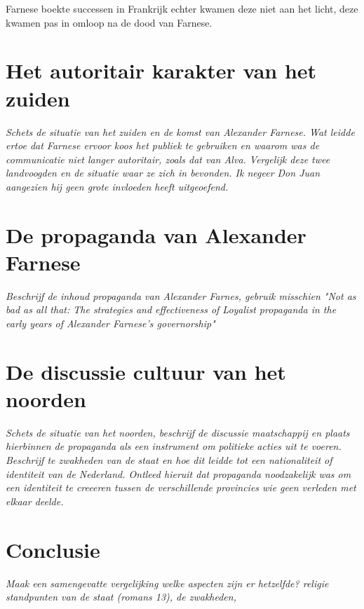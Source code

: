 \documentclass[11pt]{amsart}
\begin{document}
Farnese boekte successen in Frankrijk echter kwamen deze niet aan het licht, deze kwamen pas in omloop na de dood van Farnese.


\newpage

\section{Het autoritair karakter van het zuiden}
\textit{Schets de situatie van het zuiden en de komst van Alexander Farnese. Wat leidde ertoe dat Farnese ervoor koos het
     publiek te gebruiken en waarom was de communicatie niet langer autoritair, zoals dat van Alva. Vergelijk deze twee
     landvoogden en de situatie waar ze zich in bevonden. Ik negeer Don Juan aangezien hij geen grote invloeden heeft
     uitgeoefend.}

\section{De propaganda van Alexander Farnese}
\textit{Beschrijf de inhoud propaganda van Alexander Farnes, gebruik misschien "Not as bad as all that: The strategies and effectiveness of Loyalist propaganda in the early years of Alexander Farnese's governorship"}

\section{De discussie cultuur van het noorden}
\textit{Schets de situatie van het noorden, beschrijf de discussie maatschappij en plaats hierbinnen de propaganda als een
     instrument om politieke acties uit te voeren. Beschrijf te zwakheden van de staat en hoe dit leidde tot een nationaliteit of identiteit van de Nederland. Ontleed hieruit dat propaganda noodzakelijk was om een identiteit te creeeren tussen de verschillende provincies wie geen verleden met elkaar deelde. }

\section{Conclusie}
\textit{Maak een samengevatte vergelijking welke aspecten zijn er hetzelfde? religie standpunten van de staat (romans 13), de zwakheden, }

\newpage\printbibliography{}
\end{document}
